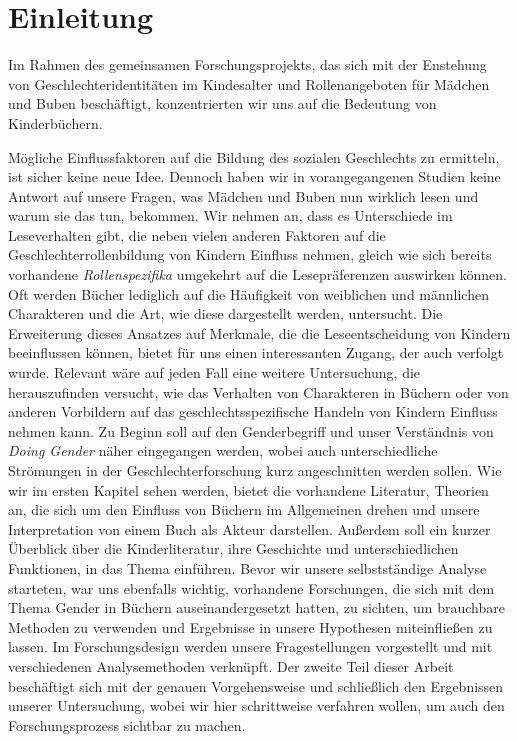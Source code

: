 \chapter{Einleitung}

Im Rahmen des gemeinsamen Forschungsprojekts, das sich mit der Enstehung
von Geschlechteridentitäten im Kindesalter und Rollenangeboten für
Mädchen und Buben beschäftigt, konzentrierten wir uns auf die Bedeutung
von Kinderbüchern.

Mögliche Einflussfaktoren auf die Bildung des sozialen Geschlechts zu
ermitteln, ist sicher keine neue Idee. Dennoch haben wir in
vorangegangenen Studien keine Antwort auf unsere Fragen, was Mädchen und
Buben nun wirklich lesen und warum sie das tun, bekommen. Wir nehmen an,
dass es Unterschiede im Leseverhalten gibt, die neben vielen anderen
Faktoren auf die Geschlechterrollenbildung von Kindern Einfluss nehmen,
gleich wie sich bereits vorhandene \emph{Rollenspezifika} umgekehrt auf
die Lesepräferenzen auswirken können. Oft werden Bücher lediglich auf
die Häufigkeit von weiblichen und männlichen Charakteren und die Art,
wie diese dargestellt werden, untersucht. Die Erweiterung dieses
Ansatzes auf Merkmale, die die Leseentscheidung von Kindern beeinflussen
können, bietet für uns einen interessanten Zugang, der auch verfolgt
wurde. Relevant wäre auf jeden Fall eine weitere Untersuchung, die
herauszufinden versucht, wie das Verhalten von Charakteren in Büchern
oder von anderen Vorbildern auf das geschlechtsspezifische Handeln von
Kindern Einfluss nehmen kann. Zu Beginn soll auf den Genderbegriff und
unser Verständnis von \emph{Doing Gender} näher eingegangen werden,
wobei auch unterschiedliche Strömungen in der Geschlechterforschung kurz
angeschnitten werden sollen. Wie wir im ersten Kapitel sehen werden,
bietet die vorhandene Literatur, Theorien an, die sich um den Einfluss
von Büchern im Allgemeinen drehen und unsere Interpretation von einem
Buch als Akteur darstellen. Außerdem soll ein kurzer Überblick über die
Kinderliteratur, ihre Geschichte und unterschiedlichen Funktionen, in
das Thema einführen. Bevor wir unsere selbstständige Analyse starteten,
war uns ebenfalls wichtig, vorhandene Forschungen, die sich mit dem
Thema Gender in Büchern auseinandergesetzt hatten, zu sichten, um
brauchbare Methoden zu verwenden und Ergebnisse in unsere Hypothesen
miteinfließen zu lassen. Im Forschungsdesign werden unsere
Fragestellungen vorgestellt und mit verschiedenen Analysemethoden
verknüpft. Der zweite Teil dieser Arbeit beschäftigt sich mit der
genauen Vorgehensweise und schließlich den Ergebnissen unserer
Untersuchung, wobei wir hier schrittweise verfahren wollen, um auch den
Forschungsprozess sichtbar zu machen.
